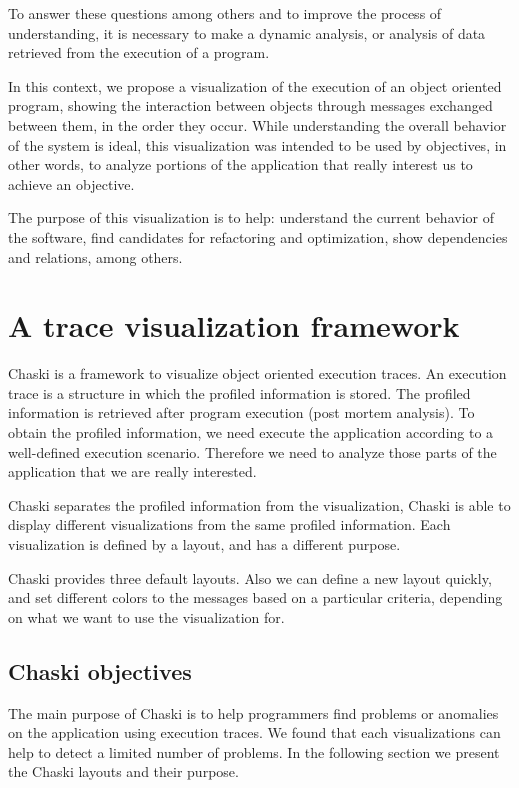 \documentclass{sig-alternate}
\newcommand{\seclabel}[1]{\label{sec:#1}}
\begin{document}
To answer these questions among others and to improve the process of understanding, it is necessary to make a dynamic analysis, or analysis of data retrieved from the execution of a program.

In this context, we propose a visualization of the execution of an object oriented program, showing the interaction between objects through messages exchanged between them, in the order they occur. While understanding the overall behavior of the system is ideal, this visualization was intended to be used by objectives, in other words, to analyze portions of the application that really interest us to achieve an objective.

The purpose of this visualization is to help: understand the current behavior of the software, find candidates for refactoring and optimization, show dependencies and relations, among others.


\section{A trace visualization framework}\seclabel{framework}

Chaski is a framework to visualize object oriented execution traces. An execution trace is a structure in which the profiled information is stored. The profiled information is retrieved after program execution (post mortem analysis). To obtain the profiled information, we need execute the application according to a well-defined execution scenario. Therefore we need to analyze those parts of the application that we are really interested.

Chaski separates the profiled information from the visualization, Chaski is able to display different visualizations from the same profiled information. Each visualization is defined by a layout, and has a different purpose.

Chaski provides three default layouts. Also we can define a new layout quickly, and set different colors to the messages based on a particular criteria, depending on what we want to use the visualization for.

\subsection{Chaski objectives}


The main purpose of Chaski is to help programmers find problems or anomalies on the application using execution traces. We found that each visualizations can help to detect a limited number of problems. In the following section we present the Chaski layouts and their purpose.
\end{document}
